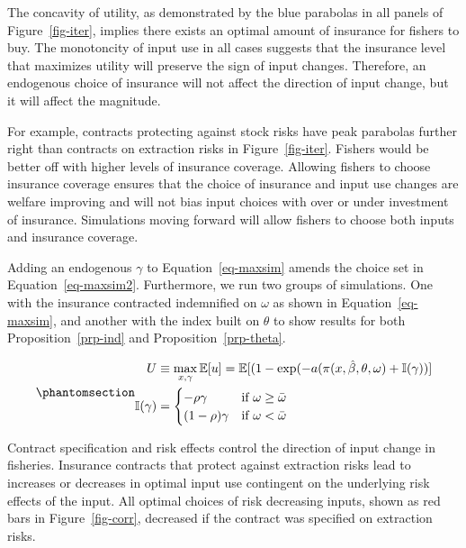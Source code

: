 \documentclass[
  letterpaper,
  DIV=11,
  numbers=noendperiod]{scrartcl}
\theoremstyle{plain}
\theoremstyle{plain}
\theoremstyle{remark}
\begin{document}
The concavity of utility, as demonstrated by the blue parabolas in all
panels of Figure~\ref{fig-iter}, implies there exists an optimal amount
of insurance for fishers to buy. The monotoncity of input use in all
cases suggests that the insurance level that maximizes utility will
preserve the sign of input changes. Therefore, an endogenous choice of
insurance will not affect the direction of input change, but it will
affect the magnitude.

For example, contracts protecting against stock risks have peak
parabolas further right than contracts on extraction risks in
Figure~\ref{fig-iter}. Fishers would be better off with higher levels of
insurance coverage. Allowing fishers to choose insurance coverage
ensures that the choice of insurance and input use changes are welfare
improving and will not bias input choices with over or under investment
of insurance. Simulations moving forward will allow fishers to choose
both inputs and insurance coverage.

Adding an endogenous \(\gamma\) to Equation~\ref{eq-maxsim} amends the
choice set in Equation~\ref{eq-maxsim2}. Furthermore, we run two groups
of simulations. One with the insurance contracted indemnified on
\(\omega\) as shown in Equation~\ref{eq-maxsim}, and another with the
index built on \(\theta\) to show results for both
Proposition~\ref{prp-ind} and Proposition~\ref{prp-theta}.

\begin{equation}\phantomsection\label{eq-maxsim2}{
\begin{aligned}
U&\equiv\max_{x,\gamma}\mathbb{E}[u]=\mathbb{E}[(1-\exp(-a(\pi(x,\hat\beta,\theta,\omega)+\mathbb{I}(\gamma))]\\
\mathbb{I}(\gamma)&=\begin{cases}-\rho\gamma & \text{if } \omega\ge \bar\omega\\
(1-\rho)\gamma & \text{if } \omega<\bar\omega
\end{cases}
\end{aligned}
}\end{equation}

Contract specification and risk effects control the direction of input
change in fisheries. Insurance contracts that protect against extraction
risks lead to increases or decreases in optimal input use contingent on
the underlying risk effects of the input. All optimal choices of risk
decreasing inputs, shown as red bars in Figure~\ref{fig-corr}, decreased
if the contract was specified on extraction risks.
\end{document}
